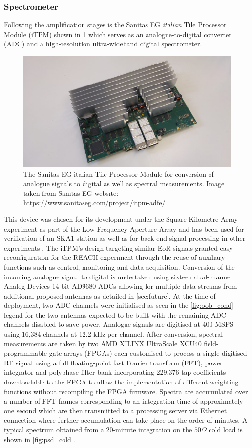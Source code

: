 \subsubsection{Spectrometer}
Following the amplification stages is the Sanitas EG \textit{italian} Tile Processor Module (iTPM) shown in \cref{fig:tpm} which serves as an analogue-to-digital converter (ADC) and a high-resolution ultra-wideband digital spectrometer.
\begin{figure}
    \centering
    \includegraphics[scale=0.4]{tpm}
    \caption{The Sanitas EG italian Tile Processor Module for conversion of analogue signals to digital as well as spectral measurements. Image taken from Sanitas EG website: \url{https://www.sanitaseg.com/project/itpm-adfe/}}
    \label{fig:tpm}
\end{figure}
This device was chosen for its development under the Square Kilometre Array experiment as part of the Low Frequency Aperture Array and has been used for verification of an SKA1 station as well as for back-end signal processing in other experiments \citep{itpm}. The iTPM's design targeting similar EoR signals granted easy reconfiguration for the REACH experiment through the reuse of auxiliary functions such as control, monitoring and data acquisition. Conversion of the incoming analogue signal to digital is undertaken using sixteen dual-channel Analog Devices 14-bit AD9680 ADCs allowing for multiple data streams from additional proposed antennas as detailed in \cref{sec:future}. At the time of deployment, two ADC channels were initialised as seen in the \cref{fig:oob_cond} legend for the two antennas expected to be built with the remaining ADC channels disabled to save power. Analogue signals are digitised at 400 MSPS using 16,384 channels at 12.2 kHz per channel. After conversion, spectral measurements are taken by two AMD XILINX UltraScale XCU40 field-programmable gate arrays (FPGAs) each customised to process a single digitised RF signal using a full floating-point fast Fourier transform (FFT), power integrator and polyphase filter bank incorporating 229,376 tap coefficients downloadable to the FPGA to allow the implementation of different weighting functions without recompiling the FPGA firmware. Spectra are accumulated over a number of FFT frames corresponding to an integration time of approximately one second which are then transmitted to a processing server via Ethernet connection where further accumulation can take place on the order of minutes. A typical spectrum obtained from a 20-minute integration on the $50 \Omega$ cold load is shown in \cref{fig:psd_cold}.
